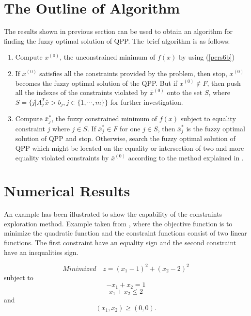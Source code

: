 \documentclass{iaesarticle3}
\begin{document}
\section{The Outline of Algorithm}\label{alg}

The results shown in previous section can be used to obtain an algorithm for finding the fuzzy optimal solution of QPP. The brief algorithm is as follows:
\begin{enumerate}
  \item Compute $\bar{x}^{(0)}$, the unconstrained minimum of $f(x)$ by using (\ref{pers6b})
  \item If $\bar{x}^{(0)}$ satisfies all the constraints provided by the problem, then stop, $\bar{x}^{(0)}$ becomes the fuzzy optimal solution of the QPP. But if $x^{(0)} \notin F$, then push all the indexes of the constraints violated by $\bar{x}^{(0)}$ onto the set $S$, where $S = \{j|A_j^T\bar{x} > b_j, j \in \{1, \cdots, m\}\}$ for further investigation.
  \item Compute $\bar{x}_j^*$, the fuzzy constrained minimum of $f(x)$ subject to equality constraint $j$ where $j \in S$. If $\bar{x}_j^* \in F$ for one $j \in S$, then $\bar{x}_j^*$ is the fuzzy optimal solution of QPP and stop. Otherwise, search the fuzzy optimal solution of QPP which might be located on the equality or intersection of two and more equality violated constraints by $\bar{x}^{(0)}$ according to the method explained in \cite{iby, isy, ism}.
\end{enumerate}

\section{Numerical Results}\label{nm}

An example has been illustrated to show the capability of the constraints exploration method. Example taken from \cite{dav}, where the objective function is to minimize the quadratic function and the constraint functions consist of two linear functions. The first constraint have an equality sign and the second constraint have an inequalities sign.

\begin{equation}\label{pers20}
    Minimized \quad z = (x_1 - 1)^2 + (x_2 - 2)^2
\end {equation}
\noindent
subject to
\begin{equation}\label{pers21}
    -x_1 + x_2 = 1
\end{equation}
\begin{equation}\label{pers22}
    x_1 + x_2 \leq 2
\end{equation}
\noindent
and
\begin{equation}\label{pers23}
    (x_1, x_2) \geq (0, 0).
\end{equation}
\end{document}
